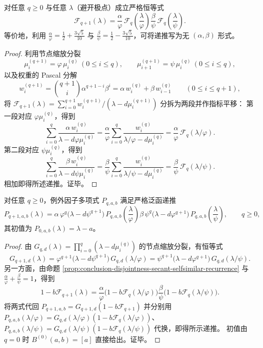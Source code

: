 

\begin{proposition}[割线函数的二尺度自相似递推]\label{prop:conclusion-disjointness-secant-selfsimilar-recurrence}
对任意 \(q\ge 0\) 与任意 \(\lambda\)（避开极点）成立严格恒等式
\[
\mathcal F_{q+1}(\lambda)
=\frac{\alpha}{\varphi}\,\mathcal F_q\!\left(\frac{\lambda}{\varphi}\right)
\frac{\beta}{\psi}\,\mathcal F_q\!\left(\frac{\lambda}{\psi}\right).
\]
等价地，利用
\(
\frac{\alpha}{\varphi}=\frac12+\frac{3\sqrt5}{10}
\)
与
\(
\frac{\beta}{\psi}=\frac12-\frac{3\sqrt5}{10}
\)，可将递推写为无 \((\alpha,\beta)\) 形式。
\end{proposition}
\begin{proof}
利用节点缩放分裂
\[
\mu_i^{(q+1)}=\varphi\,\mu_i^{(q)}\ (0\le i\le q),
\qquad
\mu_{i+1}^{(q+1)}=\psi\,\mu_i^{(q)}\ (0\le i\le q),
\]
以及权重的 Pascal 分解
\[
w_i^{(q+1)}
=\binom{q+1}{i}\alpha^{q+1-i}\beta^i
=\alpha\,w_i^{(q)}+\beta\,w_{i-1}^{(q)}
\qquad(0\le i\le q+1),
\]
将 \(\mathcal F_{q+1}(\lambda)=\sum_{i=0}^{q+1}w_i^{(q+1)}/(\lambda-d\mu_i^{(q+1)})\) 分拆为两段并作指标平移：
第一段对应 \(\varphi\mu_i^{(q)}\)，得到
\[
\sum_{i=0}^{q}\frac{\alpha\,w_i^{(q)}}{\lambda-d\varphi\mu_i^{(q)}}
=\frac{\alpha}{\varphi}\sum_{i=0}^{q}\frac{w_i^{(q)}}{\lambda/\varphi-d\mu_i^{(q)}}
=\frac{\alpha}{\varphi}\,\mathcal F_q(\lambda/\varphi).
\]
第二段对应 \(\psi\mu_i^{(q)}\)，得到
\[
\sum_{i=0}^{q}\frac{\beta\,w_i^{(q)}}{\lambda-d\psi\mu_i^{(q)}}
=\frac{\beta}{\psi}\sum_{i=0}^{q}\frac{w_i^{(q)}}{\lambda/\psi-d\mu_i^{(q)}}
=\frac{\beta}{\psi}\,\mathcal F_q(\lambda/\psi).
\]
相加即得所述递推。证毕。
\end{proof}

\begin{proposition}\label{prop:conclusion-disjointness-exceptional-poly-scaling-splice}
对任意 \(q\ge 0\)，例外因子多项式 \(P_{q,a,b}\) 满足严格泛函递推
\[
P_{q+1,a,b}(\lambda)
=\alpha\,\varphi^{q}\bigl(\lambda-d\psi^{q+1}\bigr)\,
P_{q,a,b}\!\left(\frac{\lambda}{\varphi}\right)
\beta\,\psi^{q}\bigl(\lambda-d\varphi^{q+1}\bigr)\,
P_{q,a,b}\!\left(\frac{\lambda}{\psi}\right),
\qquad q\ge 0,
\]
其初值为 \(P_{0,a,b}(\lambda)=\lambda-a\)。
\end{proposition}
\begin{proof}
由 \(G_{q,d}(\lambda)=\prod_{i=0}^{q}(\lambda-d\mu_i^{(q)})\) 的节点缩放分裂，有恒等式
\[
G_{q+1,d}(\lambda)
=\varphi^{q+1}\bigl(\lambda-d\psi^{q+1}\bigr)\,G_{q,d}(\lambda/\varphi)
=\psi^{q+1}\bigl(\lambda-d\varphi^{q+1}\bigr)\,G_{q,d}(\lambda/\psi).
\]
另一方面，由命题 \ref{prop:conclusion-disjointness-secant-selfsimilar-recurrence} 与
\(\frac{\alpha}{\varphi}+\frac{\beta}{\psi}=1\)，得到
\[
1-b\mathcal F_{q+1}(\lambda)
=\frac{\alpha}{\varphi}\bigl(1-b\mathcal F_q(\lambda/\varphi)\bigr)
\frac{\beta}{\psi}\bigl(1-b\mathcal F_q(\lambda/\psi)\bigr).
\]
将两式代回
\(
P_{q+1,a,b}=G_{q+1,d}(1-b\mathcal F_{q+1})
\)
并分别用 \(P_{q,a,b}(\lambda/\varphi)=G_{q,d}(\lambda/\varphi)(1-b\mathcal F_q(\lambda/\varphi))\)、
\(P_{q,a,b}(\lambda/\psi)=G_{q,d}(\lambda/\psi)(1-b\mathcal F_q(\lambda/\psi))\) 代换，即得所示递推。
初值由 \(q=0\) 时 \(B^{(0)}(a,b)=[a]\) 直接给出。证毕。
\end{proof}

